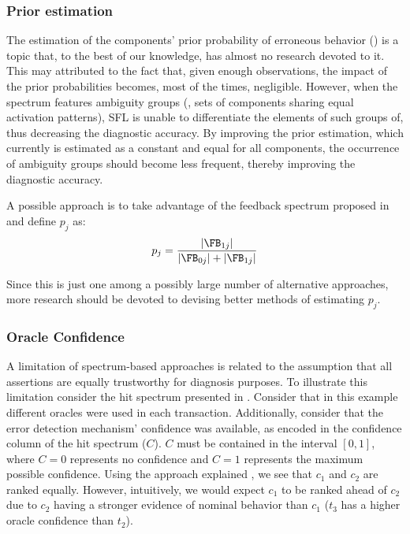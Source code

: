 \subsubsection*{Prior estimation}
The estimation of the components' prior probability of erroneous
behavior () is a topic that,
to the best of our knowledge, has almost no research devoted to it.
%
This may attributed to the fact that, given enough observations, the
impact of the prior probabilities becomes, most of the times,
negligible.
%
However, when the spectrum features ambiguity groups (\ie, sets of
components sharing equal activation patterns), \ac{SFL} is unable to
differentiate the elements of such groups of, thus decreasing the
diagnostic accuracy.
%
By improving the prior estimation, which currently is estimated as a
constant and equal for all components, the occurrence of ambiguity
groups should become less frequent, thereby improving the diagnostic
accuracy.

A possible approach is to take advantage of the feedback spectrum
proposed in  and define
$p_j$ as:
\begin{equation}
  p_j = \frac{|\FB_{1j}|}{|\FB_{0j}|+|\FB_{1j}|}
\end{equation}

Since this is just one among a possibly large number of alternative
approaches, more research should be devoted to devising better methods
of estimating $p_j$.

\subsubsection*{Oracle Confidence}
A limitation of spectrum-based approaches is related to the assumption
that all assertions are equally trustworthy for diagnosis purposes.
%
To illustrate this limitation consider the hit spectrum presented in
.
%
Consider that in this example different oracles were used in each
transaction.
%
Additionally, consider that the error detection mechanism' confidence
was available, as encoded in the confidence column of the hit spectrum
($C$).
%
$C$ must be contained in the interval $[0,1]$, where $C=0$ represents
no confidence and $C=1$ represents the maximum possible confidence.
%
Using the approach explained
, we see that $c_1$ and
$c_2$ are ranked equally.
%
However, intuitively, we would expect $c_1$ to be ranked ahead of
$c_2$ due to $c_2$ having a stronger evidence of nominal behavior than
$c_1$ ($t_3$ has a higher oracle confidence than $t_2$).

